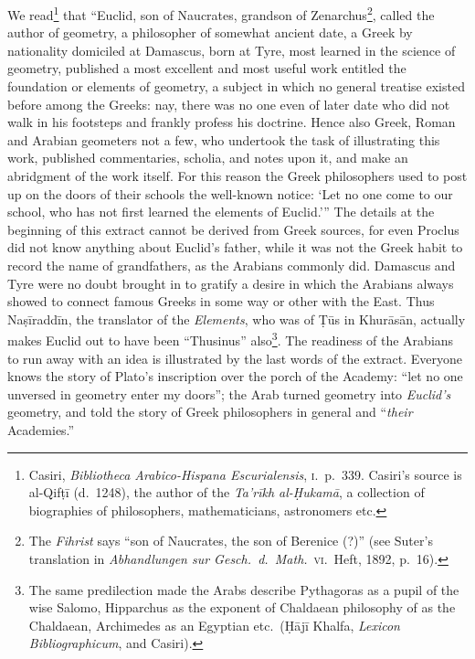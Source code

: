 We read\footnote{Casiri, \emph{Bibliotheca Arabico-Hispana Escurialensis}, \textsc{i}.~p.~339. Casiri's source is al-Qifṭī (d.~1248), the author of the \emph{Ta'rīkh al-Ḥukamā}, a collection of biographies of philosophers, mathematicians, astronomers etc.} that ``Euclid, son of Naucrates, grandson of Zenarchus\footnote{The \emph{Fihrist} says ``son of Naucrates, the son of Berenice (?)'' (see Suter's translation in \emph{Abhandlungen sur Gesch.~d.~Math.}~\textsc{vi}.~Heft, 1892, p.~16).}, called the author of geometry, a philosopher of somewhat ancient date, a Greek by nationality domiciled at Damascus, born at Tyre, most learned in the science of geometry, published a most excellent and most useful work entitled the foundation or elements of geometry, a subject in which no general treatise existed before among the Greeks: nay, there was no one even of later date who did not walk in his footsteps and frankly profess his doctrine. Hence also Greek, Roman and Arabian geometers not a few, who undertook the task of illustrating this work, published commentaries, scholia, and notes upon it, and make an abridgment of the work itself. For this reason the Greek philosophers used to post up on the doors of their schools the well-known notice: `Let no one come to our school, who has not first learned the elements of Euclid.'\thinspace'' The details at the beginning of this extract cannot be derived from Greek sources, for even Proclus did not know anything about Euclid's father, while it was not the Greek habit to record the name of grandfathers, as the Arabians commonly did. Damascus and Tyre were no doubt brought in to gratify a desire in which the Arabians always showed to connect famous Greeks in some way or other with the East. Thus Naṣīraddīn, the translator of the \emph{Elements}, who was of Ṭūs in Khurāsān, actually makes Euclid out to have been ``Thusinus'' also\footnote{The same predilection made the Arabs describe Pythagoras as a pupil of the wise Salomo, Hipparchus as the exponent of Chaldaean philosophy of as the Chaldaean, Archimedes as an Egyptian etc.\ (Ḥājī Khalfa, \emph{Lexicon Bibliographicum}, and Casiri).}. The readiness of the Arabians to run away with an idea is illustrated by the last words of the extract. Everyone knows the story of Plato's inscription over the porch of the Academy: ``let no one unversed in geometry enter my doors''; the Arab turned geometry into \emph{Euclid's} geometry, and told the story of Greek philosophers in general and ``\emph{their} Academies.''

